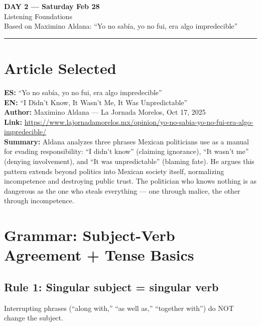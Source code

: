 \documentclass[10pt,a4paper]{article}
\begin{document}
\begin{center}
{\LARGE \textbf{DAY 2 --- Saturday Feb 28}}\\[4pt]
{\large Listening Foundations}\\[2pt]
{\normalsize Based on Maximino Aldana:
``Yo no sab\'ia, yo no fui, era algo impredecible''}\\[2pt]
\rule{\textwidth}{0.8pt}
\end{center}

\section*{Article Selected}

\begin{tcolorbox}[colback=white, colframe=black]
\textbf{ES:} ``Yo no sab\'ia, yo no fui, era algo impredecible''\\
\textbf{EN:} ``I Didn't Know, It Wasn't Me, It Was Unpredictable''\\
\textbf{Author:} Maximino Aldana --- La Jornada Morelos, Oct 17, 2025\\
\textbf{Link:}
\url{https://www.lajornadamorelos.mx/opinion/yo-no-sabia-yo-no-fui-era-algo-impredecible/}\\[4pt]
\textbf{Summary:} Aldana analyzes three phrases Mexican politicians
use as a manual for evading responsibility: ``I didn't know''
(claiming ignorance), ``It wasn't me'' (denying involvement), and
``It was unpredictable'' (blaming fate). He argues this pattern
extends beyond politics into Mexican society itself, normalizing
incompetence and destroying public trust. The politician who knows
nothing is as dangerous as the one who steals everything --- one
through malice, the other through incompetence.
\end{tcolorbox}

\section*{Grammar: Subject-Verb Agreement + Tense Basics}

\subsection*{Rule 1: Singular subject = singular verb}

Interrupting phrases (``along with,'' ``as well as,'' ``together
with'') do NOT change the subject.
\end{document}
